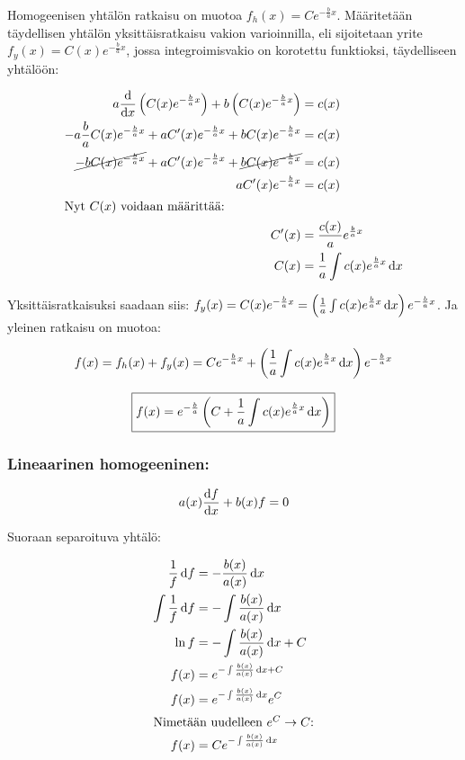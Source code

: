 \documentclass[../johdoksia.tex]{subfiles}
\begin{document}
	Homogeenisen yhtälön ratkaisu on muotoa $f_h(x) = Ce^{-\frac{b}{a}x}$. Määritetään täydellisen yhtälön yksittäisratkaisu vakion varioinnilla, eli sijoitetaan yrite $f_y(x) = C(x)e^{-\frac{b}{a}x}$, jossa integroimisvakio on korotettu funktioksi, täydelliseen yhtälöön:
	
	\begin{align*}
		a\odv{}{x}\left(C(x)e^{-\frac{b}{a}x}\right) + b\left(C(x)e^{-\frac{b}{a}x}\right) &= c(x) \\
		-a\frac{b}{a}C(x)e^{-\frac{b}{a}x} + aC'(x)e^{-\frac{b}{a}x} + bC(x)e^{-\frac{b}{a}x} &= c(x) \\
		\cancel{-bC(x)e^{-\frac{b}{a}x}} + aC'(x)e^{-\frac{b}{a}x} + \cancel{bC(x)e^{-\frac{b}{a}x}} &= c(x) \\
		aC'(x)e^{-\frac{b}{a}x} &= c(x) \\
		\intertext{Nyt $C(x)$ voidaan määrittää:}
		C'(x) &= \frac{c(x)}{a}e^{\frac{b}{a}x} \\
		C(x) &= \frac{1}{a}\int c(x)e^{\frac{b}{a}x}\odif{x}
	\end{align*}
	
	Yksittäisratkaisuksi saadaan siis: $f_y(x) = C(x)e^{-\frac{b}{a}x} = \left(\frac{1}{a}\int c(x)e^{\frac{b}{a}x}\odif{x}\right)e^{-\frac{b}{a}x}$. Ja yleinen ratkaisu on muotoa:
	
	\begin{equation*}
		f(x) = f_h(x) + f_y(x) = Ce^{-\frac{b}{a}x} + \left(\frac{1}{a}\int c(x)e^{\frac{b}{a}x}\odif{x}\right)e^{-\frac{b}{a}x}
	\end{equation*}
	
	\begin{equation}
		\boxed{f(x) = e^{-\frac{b}{a}}\left(C + \frac{1}{a}\int c(x)e^{\frac{b}{a}x}\odif{x}\right)}
	\end{equation}
	
	\subsubsection{Lineaarinen homogeeninen:}
	
	\begin{equation}
		\label{lin_hom}
		a(x)\odv{f}{x} + b(x)f = 0
	\end{equation}
	
	Suoraan separoituva yhtälö:
	
	\begin{align*}
		\frac{1}{f}\odif{f} &= -\frac{b(x)}{a(x)}\odif{x} \\
		\int\frac{1}{f}\odif{f} &= -\int\frac{b(x)}{a(x)}\odif{x} \\
		\ln f &= -\int\frac{b(x)}{a(x)}\odif{x} + C \\
		f(x) &= e^{-\int\frac{b(x)}{a(x)}\odif{x} + C} \\
		f(x) &= e^{-\int\frac{b(x)}{a(x)}\odif{x}}e^C \\
		\intertext{Nimetään uudelleen $e^C \to C$:}
		f(x) &= Ce^{-\int\frac{b(x)}{a(x)}\odif{x}}
	\end{align*}
	
\end{document}
